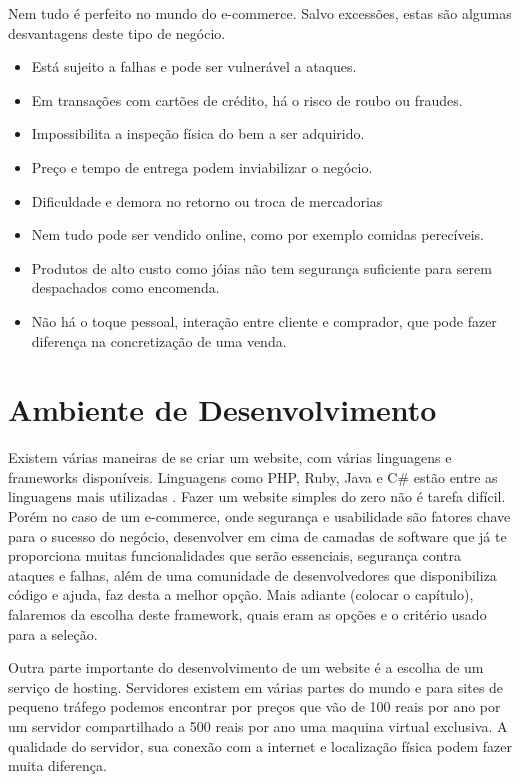 Nem tudo é perfeito no mundo do e-commerce. Salvo excessões, estas são algumas desvantagens deste tipo de negócio.

\begin{itemize}
  \item Está sujeito a falhas e pode ser vulnerável a ataques.
  \item Em transações com cartões de crédito, há o risco de roubo ou fraudes.
  \item Impossibilita a inspeção física do bem a ser adquirido.
  \item Preço e tempo de entrega podem inviabilizar o negócio.
  \item Dificuldade e demora no retorno ou troca de mercadorias
  \item Nem tudo pode ser vendido online, como por exemplo comidas perecíveis.
  \item Produtos de alto custo como jóias não tem segurança suficiente para serem despachados como encomenda.
  \item Não há o toque pessoal, interação entre cliente e comprador, que pode fazer diferença na concretização de uma venda.
\end{itemize}


\section{Ambiente de Desenvolvimento}

Existem várias maneiras de se criar um website, com várias linguagens e frameworks disponíveis. Linguagens como PHP, Ruby, Java e C# estão entre as linguagens mais utilizadas \cite{UsageStatistics}. Fazer um website simples do zero não é tarefa difícil. Porém no caso de um e-commerce, onde segurança e usabilidade são fatores chave para o sucesso do negócio, desenvolver em cima de camadas de software que já te proporciona muitas funcionalidades que serão essenciais, segurança contra ataques e falhas, além de uma comunidade de desenvolvedores que disponibiliza código e ajuda, faz desta a melhor opção. Mais adiante (\TODO colocar o capítulo), falaremos da escolha deste framework, quais eram as opções e o critério usado para a seleção.

Outra parte importante do desenvolvimento de um website é a escolha de um serviço de hosting. Servidores existem em várias partes do mundo e para sites de pequeno tráfego podemos encontrar por preços que vão de 100 reais por ano por um servidor compartilhado a 500 reais por ano uma maquina virtual exclusiva. A qualidade do servidor, sua conexão com a internet e localização física podem fazer muita diferença.

